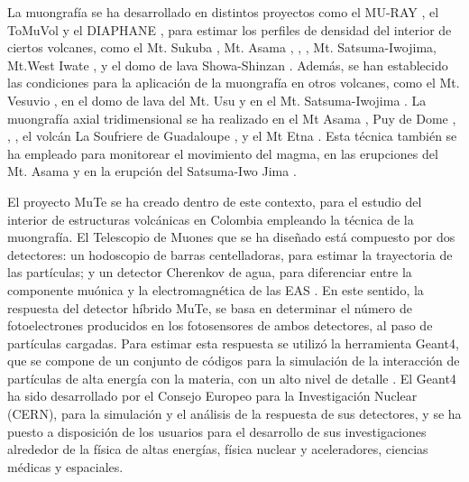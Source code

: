 \documentclass[12pt,oneside,openany,letter]{book}
\begin{document}
La muongrafía se ha desarrollado en distintos proyectos como el MU-RAY \cite{Anastasio-etal2013}, el ToMuVol \cite{carloganu2013towards} y el DIAPHANE \cite{lesparre-etal2010}, para estimar los perfiles de densidad del interior de ciertos volcanes, como el Mt. Sukuba \cite{Nagamine-etal1995}, Mt. Asama \cite{Tanaka-etal2001hi}, \cite{Tanaka-etal2007epsl}, \cite{Tanaka2007}, Mt. Satsuma-Iwojima, Mt.West Iwate \cite{Tanaka-etal2005nimprs}, y el domo de lava Showa-Shinzan \cite{Tanaka-etal2007grl}. Adem\'as, se han establecido las condiciones para la aplicación de la muongrafía en otros volcanes, como el Mt. Vesuvio \cite{Beauducel-etal2008}, en el domo de lava del Mt. Usu \cite{Tanaka-Yokoyama2008} y en el Mt. Satsuma-Iwojima \cite{Tanaka-etal2009}. La muongrafía axial tridimensional se ha realizado en el Mt Asama \cite{Tanaka-etal2010wol}, Puy de Dome \cite{carloganu2013towards}, \cite{Carloganu2011}, \cite{Portal-etal2013}, el volcán La Soufriere de Guadaloupe \cite{Lesparre-etal2012-gji}, \cite{jourde2013experimental} y el Mt Etna \cite{Carbone-etal2014}. Esta t\'ecnica tambi\'en se ha empleado para monitorear el movimiento del magma, en las erupciones del Mt. Asama y en la erupción del Satsuma-Iwo Jima \cite{Tanaka-etal2014nc}.  

El proyecto MuTe se ha creado dentro de este contexto, para el estudio del interior de estructuras volc\'anicas en Colombia empleando la técnica de la muongrafía. El Telescopio de Muones que se ha diseñado est\'a compuesto por dos detectores: un hodoscopio de barras centelladoras, para estimar la trayectoria de las partículas; y un detector Cherenkov de agua, para diferenciar entre la componente mu\'onica y la electromagn\'etica de las EAS \cite{SuarezDuran2016}. En este sentido, la respuesta del detector h\'ibrido MuTe, se basa en determinar el n\'umero de fotoelectrones producidos en los fotosensores de ambos detectores, al paso de part\'iculas cargadas. Para estimar esta respuesta se utiliz\'o la herramienta Geant4, que se compone de un conjunto de c\'odigos para la simulaci\'on de la interacci\'on de part\'iculas de alta energ\'ia con la materia, con un alto nivel de detalle \cite{Geant4}. El Geant4 ha sido desarrollado por el Consejo Europeo para la Investigaci\'on Nuclear (CERN), para la simulaci\'on y el an\'alisis de la respuesta de sus detectores, y se ha puesto a disposici\'on de los usuarios para el desarrollo de sus investigaciones alrededor de la f\'isica de altas energ\'ias, f\'isica nuclear y aceleradores, ciencias m\'edicas y espaciales. 
\end{document}

